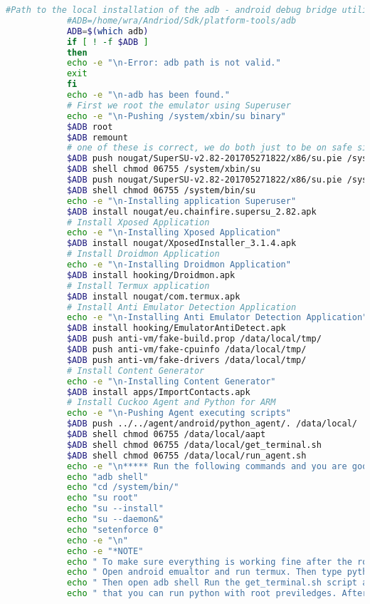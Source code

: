 \documentclass[../main.tex]{subfile}
\begin{document}
\begin{enumerate}
\begin{lstlisting}[language=bash]
			#Path to the local installation of the adb - android debug bridge utility.
			#ADB=/home/wra/Andriod/Sdk/platform-tools/adb
			ADB=$(which adb)
			if [ ! -f $ADB ]
			then
			echo -e "\n-Error: adb path is not valid."
			exit
			fi
			echo -e "\n-adb has been found."
			# First we root the emulator using Superuser
			echo -e "\n-Pushing /system/xbin/su binary"
			$ADB root
			$ADB remount
			# one of these is correct, we do both just to be on safe side
			$ADB push nougat/SuperSU-v2.82-201705271822/x86/su.pie /system/xbin/su
			$ADB shell chmod 06755 /system/xbin/su
			$ADB push nougat/SuperSU-v2.82-201705271822/x86/su.pie /system/bin/su
			$ADB shell chmod 06755 /system/bin/su
			echo -e "\n-Installing application Superuser"
			$ADB install nougat/eu.chainfire.supersu_2.82.apk
			# Install Xposed Application
			echo -e "\n-Installing Xposed Application"
			$ADB install nougat/XposedInstaller_3.1.4.apk
			# Install Droidmon Application
			echo -e "\n-Installing Droidmon Application"
			$ADB install hooking/Droidmon.apk
			# Install Termux application
			$ADB install nougat/com.termux.apk
			# Install Anti Emulator Detection Application
			echo -e "\n-Installing Anti Emulator Detection Application"
			$ADB install hooking/EmulatorAntiDetect.apk
			$ADB push anti-vm/fake-build.prop /data/local/tmp/
			$ADB push anti-vm/fake-cpuinfo /data/local/tmp/
			$ADB push anti-vm/fake-drivers /data/local/tmp/
			# Install Content Generator
			echo -e "\n-Installing Content Generator"
			$ADB install apps/ImportContacts.apk
			# Install Cuckoo Agent and Python for ARM
			echo -e "\n-Pushing Agent executing scripts"
			$ADB push ../../agent/android/python_agent/. /data/local/ 
			$ADB shell chmod 06755 /data/local/aapt
			$ADB shell chmod 06755 /data/local/get_terminal.sh
			$ADB shell chmod 06755 /data/local/run_agent.sh
			echo -e "\n***** Run the following commands and you are good to go*****\n"
			echo "adb shell"
			echo "cd /system/bin/"
			echo "su root"
			echo "su --install"
			echo "su --daemon&"
			echo "setenforce 0"
			echo -e "\n"
			echo -e "*NOTE"
			echo " To make sure everything is working fine after the rooting is done, do the following:"
			echo " Open android emualtor and run termux. Then type python2 to make sure to that python is installed"
			echo " Then open adb shell Run the get_terminal.sh script and then type python2 to verify that you "
			echo " that you can run python with root previledges. After that run run_agent.sh and verify that agent is running."
			\end{lstlisting}
			

\end{enumerate}
\end{document}
